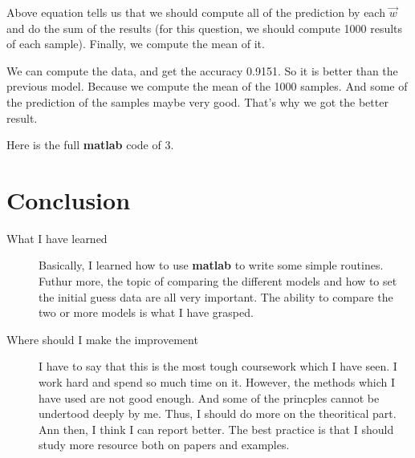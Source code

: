 \documentclass{article}
\begin{document}
Above equation tells us that we should compute all of the prediction by each $\vec{w}$ and do the sum of the results
(for this question, we should compute 1000 results of each sample). Finally, we compute the mean of it.

We can compute the data, and get the accuracy 0.9151. So it is better than the previous model.
Because we compute the mean of the 1000 samples. And some of the prediction of the samples maybe very good. That's why we got
the better result.

Here is the full \textbf{matlab} code of 3.



\section*{Conclusion}

\begin{description}
	\item[What I have learned]
        Basically, I learned how to use \textbf{matlab} to write some simple routines.
        Futhur more, the topic of comparing the different models and how to set the initial guess data are all very important.
        The ability to compare the two or more models is what I have grasped.
	\item[Where should I make the improvement]
        I have to say that this is the most tough coursework which I have seen. I work hard and spend so much time on it. However, 
        the methods which I have used are not good enough. And some of the princples cannot be undertood deeply by me. Thus, I should do more
        on the theoritical part. Ann then, I think I can report better. 
        The best practice is that I should study more resource both on papers and examples. 
\end{description}
\end{document}
